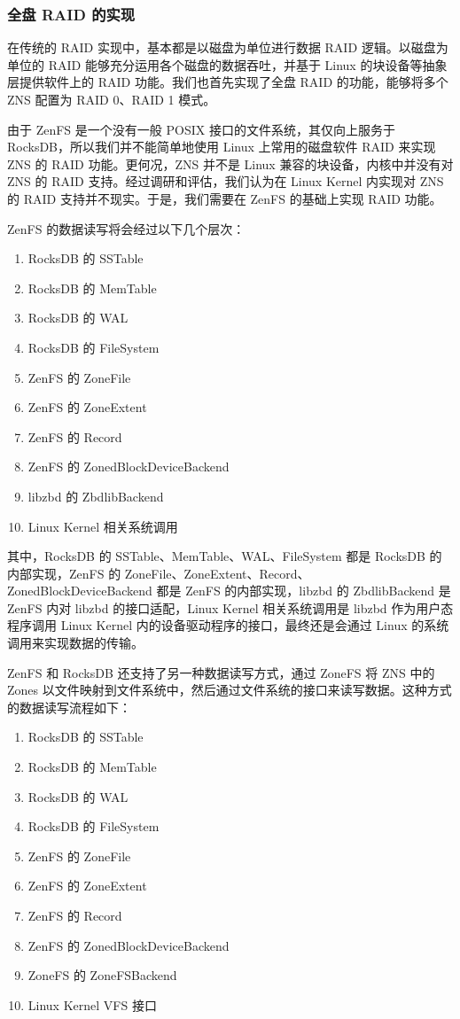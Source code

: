\subsubsection{全盘 RAID 的实现}

在传统的 RAID 实现中，基本都是以磁盘为单位进行数据 RAID 逻辑。以磁盘为单位的 RAID 能够充分运用各个磁盘的数据吞吐，并基于 Linux 的块设备等抽象层提供软件上的 RAID 功能。我们也首先实现了全盘 RAID 的功能，能够将多个 ZNS 配置为 RAID 0、RAID 1 模式。

由于 ZenFS 是一个没有一般 POSIX 接口的文件系统，其仅向上服务于 RocksDB，所以我们并不能简单地使用 Linux 上常用的磁盘软件 RAID 来实现 ZNS 的 RAID 功能。更何况，ZNS 并不是 Linux 兼容的块设备，内核中并没有对 ZNS 的 RAID 支持。经过调研和评估，我们认为在 Linux Kernel 内实现对 ZNS 的 RAID 支持并不现实。于是，我们需要在 ZenFS 的基础上实现 RAID 功能。

ZenFS 的数据读写将会经过以下几个层次：

\begin{enumerate}
  \item RocksDB 的 SSTable
  \item RocksDB 的 MemTable
  \item RocksDB 的 WAL
  \item RocksDB 的 FileSystem
  \item ZenFS 的 ZoneFile
  \item ZenFS 的 ZoneExtent
  \item ZenFS 的 Record
  \item ZenFS 的 ZonedBlockDeviceBackend
  \item libzbd 的 ZbdlibBackend
  \item Linux Kernel 相关系统调用
\end{enumerate}

其中，RocksDB 的 SSTable、MemTable、WAL、FileSystem 都是 RocksDB 的内部实现，ZenFS 的 ZoneFile、ZoneExtent、Record、ZonedBlockDeviceBackend 都是 ZenFS 的内部实现，libzbd 的 ZbdlibBackend 是 ZenFS 内对 libzbd 的接口适配，Linux Kernel 相关系统调用是 libzbd 作为用户态程序调用 Linux Kernel 内的设备驱动程序的接口，最终还是会通过 Linux 的系统调用来实现数据的传输。

ZenFS 和 RocksDB 还支持了另一种数据读写方式，通过 ZoneFS 将 ZNS 中的 Zones 以文件映射到文件系统中，然后通过文件系统的接口来读写数据。这种方式的数据读写流程如下：

\begin{enumerate}
  \item RocksDB 的 SSTable
  \item RocksDB 的 MemTable
  \item RocksDB 的 WAL
  \item RocksDB 的 FileSystem
  \item ZenFS 的 ZoneFile
  \item ZenFS 的 ZoneExtent
  \item ZenFS 的 Record
  \item ZenFS 的 ZonedBlockDeviceBackend
  \item ZoneFS 的 ZoneFSBackend
  \item Linux Kernel VFS 接口
\end{enumerate}

